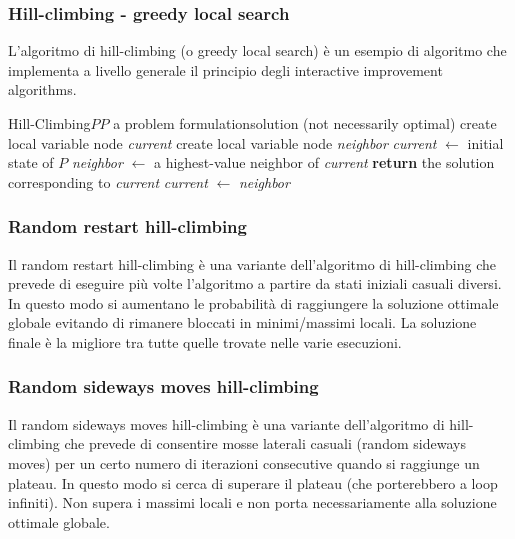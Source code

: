\subsubsection*{Hill-climbing - greedy local search}
L'algoritmo di hill-climbing (o greedy local search) è un esempio di algoritmo che implementa a livello generale il principio
degli interactive improvement algorithms.

\begin{algo}{Hill-Climbing}{$P$}{$P$ a problem formulation}{solution (not necessarily optimal)}
	\State create local variable node \textit{current}
	\State create local variable node \textit{neighbor}
	\State \textit{current} $\gets$ initial state of $P$
	\Loop
		\State \textit{neighbor} $\gets$ a highest-value neighbor of \textit{current}
			\State \textbf{return} the solution corresponding to \textit{current} 
		\EndIf
		\State \textit{current} $\gets$ \textit{neighbor} 
	\EndLoop
\end{algo}

\subsubsection*{Random restart hill-climbing}
Il random restart hill-climbing è una variante dell'algoritmo di hill-climbing che prevede di eseguire più volte l'algoritmo
a partire da stati iniziali casuali diversi. In questo modo si aumentano le probabilità di raggiungere la soluzione ottimale
globale evitando di rimanere bloccati in minimi/massimi locali. La soluzione finale è la migliore tra tutte quelle trovate nelle
varie esecuzioni.

\subsubsection*{Random sideways moves hill-climbing}
Il random sideways moves hill-climbing è una variante dell'algoritmo di hill-climbing che prevede di consentire mosse laterali
casuali (random sideways moves) per un certo numero di iterazioni consecutive quando si raggiunge un plateau. In questo modo
si cerca di superare il plateau (che porterebbero a loop infiniti). Non supera i massimi locali e non porta necessariamente alla
soluzione ottimale globale.

